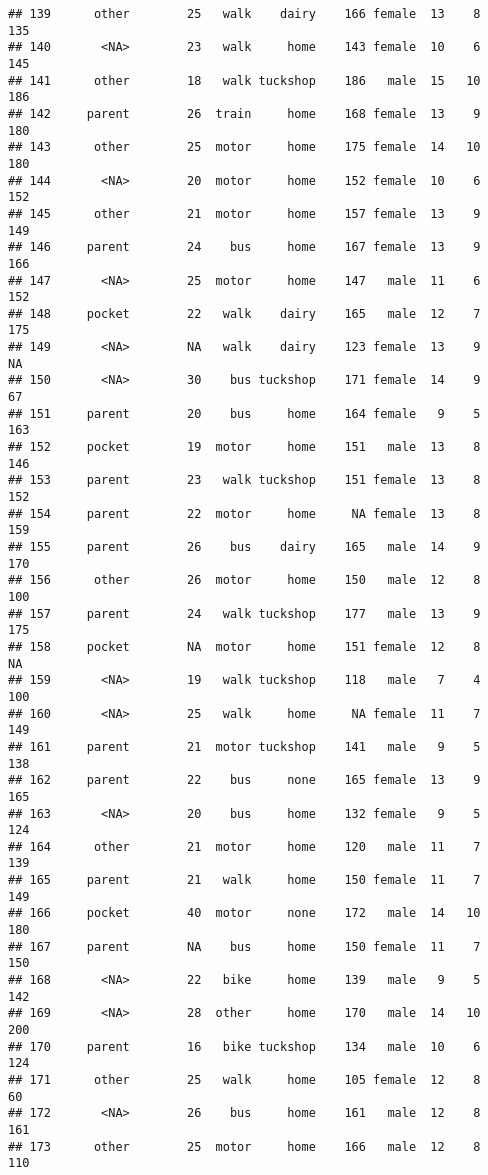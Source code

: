\documentclass[
]{article}
\begin{document}
\begin{verbatim}
## 139      other        25   walk    dairy    166 female  13    8     135
## 140       <NA>        23   walk     home    143 female  10    6     145
## 141      other        18   walk tuckshop    186   male  15   10     186
## 142     parent        26  train     home    168 female  13    9     180
## 143      other        25  motor     home    175 female  14   10     180
## 144       <NA>        20  motor     home    152 female  10    6     152
## 145      other        21  motor     home    157 female  13    9     149
## 146     parent        24    bus     home    167 female  13    9     166
## 147       <NA>        25  motor     home    147   male  11    6     152
## 148     pocket        22   walk    dairy    165   male  12    7     175
## 149       <NA>        NA   walk    dairy    123 female  13    9      NA
## 150       <NA>        30    bus tuckshop    171 female  14    9      67
## 151     parent        20    bus     home    164 female   9    5     163
## 152     pocket        19  motor     home    151   male  13    8     146
## 153     parent        23   walk tuckshop    151 female  13    8     152
## 154     parent        22  motor     home     NA female  13    8     159
## 155     parent        26    bus    dairy    165   male  14    9     170
## 156      other        26  motor     home    150   male  12    8     100
## 157     parent        24   walk tuckshop    177   male  13    9     175
## 158     pocket        NA  motor     home    151 female  12    8      NA
## 159       <NA>        19   walk tuckshop    118   male   7    4     100
## 160       <NA>        25   walk     home     NA female  11    7     149
## 161     parent        21  motor tuckshop    141   male   9    5     138
## 162     parent        22    bus     none    165 female  13    9     165
## 163       <NA>        20    bus     home    132 female   9    5     124
## 164      other        21  motor     home    120   male  11    7     139
## 165     parent        21   walk     home    150 female  11    7     149
## 166     pocket        40  motor     none    172   male  14   10     180
## 167     parent        NA    bus     home    150 female  11    7     150
## 168       <NA>        22   bike     home    139   male   9    5     142
## 169       <NA>        28  other     home    170   male  14   10     200
## 170     parent        16   bike tuckshop    134   male  10    6     124
## 171      other        25   walk     home    105 female  12    8      60
## 172       <NA>        26    bus     home    161   male  12    8     161
## 173      other        25  motor     home    166   male  12    8     110

\end{verbatim}
\end{document}
